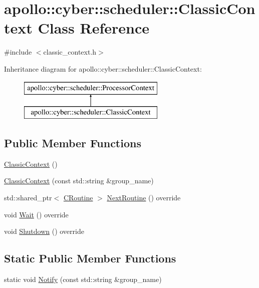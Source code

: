 \hypertarget{classapollo_1_1cyber_1_1scheduler_1_1ClassicContext}{\section{apollo\-:\-:cyber\-:\-:scheduler\-:\-:Classic\-Context Class Reference}
\label{classapollo_1_1cyber_1_1scheduler_1_1ClassicContext}
}


{\ttfamily \#include $<$classic\-\_\-context.\-h$>$}

Inheritance diagram for apollo\-:\-:cyber\-:\-:scheduler\-:\-:Classic\-Context\-:\begin{figure}[H]
\begin{center}
\leavevmode
\includegraphics[height=2.000000cm]{classapollo_1_1cyber_1_1scheduler_1_1ClassicContext}
\end{center}
\end{figure}
\subsection*{Public Member Functions}
\begin{DoxyCompactItemize}
\item 
\hyperlink{classapollo_1_1cyber_1_1scheduler_1_1ClassicContext_a663924838acb75ef7c041bc435a8142f}{Classic\-Context} ()
\item 
\hyperlink{classapollo_1_1cyber_1_1scheduler_1_1ClassicContext_aeaaa88d1cab549ab2800f5e229c1244a}{Classic\-Context} (const std\-::string \&group\-\_\-name)
\item 
std\-::shared\-\_\-ptr$<$ \hyperlink{classapollo_1_1cyber_1_1croutine_1_1CRoutine}{C\-Routine} $>$ \hyperlink{classapollo_1_1cyber_1_1scheduler_1_1ClassicContext_a6a9ffd7b5fb645a97b7daf93d4973025}{Next\-Routine} () override
\item 
void \hyperlink{classapollo_1_1cyber_1_1scheduler_1_1ClassicContext_ac32e655ea3689a0bc06c9003852fd0a3}{Wait} () override
\item 
void \hyperlink{classapollo_1_1cyber_1_1scheduler_1_1ClassicContext_aa6c94b93d17fb4f546c8f2f7e74f832a}{Shutdown} () override
\end{DoxyCompactItemize}
\subsection*{Static Public Member Functions}
\begin{DoxyCompactItemize}
\item 
static void \hyperlink{classapollo_1_1cyber_1_1scheduler_1_1ClassicContext_afaa6f92a7ea305b55cd96763cbdd2a90}{Notify} (const std\-::string \&group\-\_\-name)
\end{DoxyCompactItemize}
